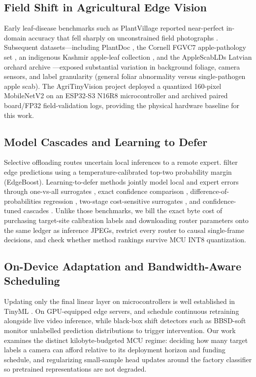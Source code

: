 \documentclass[preprint,12pt,authoryear]{elsarticle}
\begin{document}
\subsection{Field Shift in Agricultural Edge Vision}
Early leaf-disease benchmarks such as PlantVillage reported near-perfect in-domain accuracy that fell sharply on unconstrained field photographs \citep{mohanty2016}. Subsequent datasets---including PlantDoc \citep{singh2020}, the Cornell FGVC7 apple-pathology set \citep{cornell}, an indigenous Kashmir apple-leaf collection \citep{kashmir}, and the AppleScabLDs Latvian orchard archive \citep{latvia}---exposed substantial variation in background foliage, camera sensors, and label granularity (general foliar abnormality versus single-pathogen apple scab). The AgriTinyVision project \citep{agri} deployed a quantized 160-pixel MobileNetV2 on an ESP32-S3 N16R8 microcontroller and archived paired board/FP32 field-validation logs, providing the physical hardware baseline for this work.

\subsection{Model Cascades and Learning to Defer}
Selective offloading routes uncertain local inferences to a remote expert. \citet{edgeboost} filter edge predictions using a temperature-calibrated top-two probability margin (EdgeBoost). Learning-to-defer methods jointly model local and expert errors through one-vs-all surrogates \citep{ova}, exact confidence comparison \citep{compareconf}, difference-of-probabilities regression \citep{jitkrittum2023}, two-stage cost-sensitive surrogates \citep{mao2025}, and confidence-tuned cascades \citep{gatekeeper}. Unlike those benchmarks, we bill the exact byte cost of purchasing target-site calibration labels and downloading router parameters onto the same ledger as inference JPEGs, restrict every router to causal single-frame decisions, and check whether method rankings survive MCU INT8 quantization.

\subsection{On-Device Adaptation and Bandwidth-Aware Scheduling}
Updating only the final linear layer on microcontrollers is well established in TinyML \citep{tinyol,lin2022}. On GPU-equipped edge servers, \citet{ekya} and \citet{remembrall} schedule continuous retraining alongside live video inference, while black-box shift detectors such as BBSD-soft \citep{bbsd} monitor unlabelled prediction distributions to trigger intervention. Our work examines the distinct kilobyte-budgeted MCU regime: deciding how many target labels a camera can afford relative to its deployment horizon and funding schedule, and regularizing small-sample head updates around the factory classifier so pretrained representations are not degraded.
\end{document}
